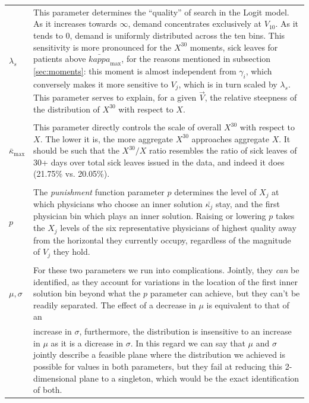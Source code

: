 \documentclass[../main.tex]{subfiles}
\begin{document}
\vspace{0.5em}
\begin{xltabular}{\textwidth}{lX}
  
  
    $\lambda_s$ & This parameter determines the ``quality'' of search in the Logit model. As it increases towards $\infty$, demand concentrates exclusively at $V_{10}$. As it tends to 0, demand is uniformly distributed across the ten bins. This sensitivity is more pronounced for the $X^{30}$ moments, sick leaves for patients above $\bar{kappa}_{\max}$, for the reasons mentioned in subsection \ref{sec:moments}: this moment is almost independent from $\gamma_i$, which conversely makes it more sensitive to $V_j$, which is in turn scaled by  $\lambda_s$. This parameter serves to explain, for a given $\vec{V}$, the relative steepness of the distribution of $X^{30}$ with respect to $X$. \\
    \\
    $\bar{\kappa}_{\max}$ & This parameter directly controls the scale of overall $X^{30}$ with respect to $X$. The lower it is, the more aggregate $X^{30}$ approaches aggregate $X$. It should be such that the $X^{30}/X$ ratio resembles the ratio of sick leaves of 30+ days over total sick leaves issued in the data, and indeed it does (21.75\% vs. 20.05\%). \\
    \\
    $p$ & The \textit{punishment} function parameter $p$ determines the level of $X_j$ at which physicians who choose an inner solution $\bar{\kappa_j}$ stay, and the first physician bin which plays an inner solution. Raising or lowering $p$ takes the $X_j$ levels of the six representative physicians of highest quality away from the horizontal they currently occupy, regardless of the magnitude of $V_j$ they hold. \\
    \\
    $\mu, \sigma$ & For these two parameters we run into complications. Jointly, they \textit{can} be identified, as they account for variations in the location of the first inner solution bin beyond what the $p$ parameter can achieve, but they can't be readily separated. The effect of a decrease in $\mu$ is equivalent to that of an \\
    & increase in $\sigma$, furthermore, the distribution is insensitive to an increase in $\mu$ as it is a dicrease in $\sigma$. In this regard we can say that $\mu$ and $\sigma$ jointly describe a feasible plane where the distribution we achieved is possible for values in both parameters, but they fail at reducing this 2-dimensional plane to a singleton, which would be the exact identification of both.
\end{xltabular}
\end{document}
